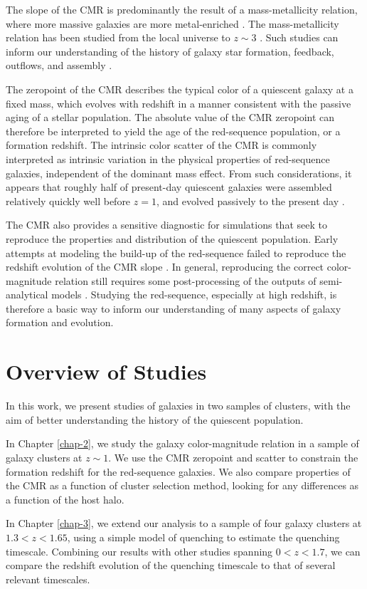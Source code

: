 The slope of the CMR is predominantly the result of a mass-metallicity relation, where more massive galaxies are more metal-enriched \citep[e.g.,][]{Bower:1992mb,Kodama:1997rr,Vazdekis:2001aa,2003AJ....125.1866B}.
The mass-metallicity relation has been studied from the local universe to $z\sim3$ \citep{Tremonti:2004aa,Kewley:2008aa,Andrews:2013aa,Erb:2006aa,Maiolino:2008aa,DeGroot:2016aa}.
Such studies can inform our understanding of the history of galaxy star formation, feedback, outflows, and assembly \citep{Finlator:2008aa,Font:2008aa,Peeples:2011aa}.

The zeropoint of the CMR describes the typical color of a quiescent galaxy at a fixed mass, which evolves with redshift in a manner consistent with the passive aging of a stellar population.
The absolute value of the CMR zeropoint can therefore be interpreted to yield the age of the red-sequence population, or a formation redshift.
The intrinsic color scatter of the CMR is commonly interpreted as intrinsic variation in the physical properties of red-sequence galaxies, independent of the dominant mass effect.
From such considerations, it appears that roughly half of present-day quiescent galaxies were assembled relatively quickly well before $z=1$, and evolved passively to the present day \citep[e.g.,][]{Bower:1998cr,Peebles:2002aa,2003ApJ...596L.143B,Mei:2009wt,Foltz:2015aa}.

The CMR also provides a sensitive diagnostic for simulations that seek to reproduce the properties and distribution of the quiescent population.
Early attempts at modeling the build-up of the red-sequence failed to reproduce the redshift evolution of the CMR slope \citep{Romeo:2008aa,Menci:2008aa}.
In general, reproducing the correct color-magnitude relation still requires some post-processing of the outputs of semi-analytical models \citep[see e.g.][]{Ascaso:2015aa}.
Studying the red-sequence, especially at high redshift, is therefore a basic way to inform our understanding of many aspects of galaxy formation and evolution.

\section{Overview of Studies}

In this work, we present studies of galaxies in two samples of clusters, with the aim of better understanding the history of the quiescent population.

In Chapter \ref{chap-2}, we study the galaxy color-magnitude relation in a sample of galaxy clusters at $z\sim1$.
We use the CMR zeropoint and scatter to constrain the formation redshift for the red-sequence galaxies.
We also compare properties of the CMR as a function of cluster selection method, looking for any differences as a function of the host halo.

In Chapter \ref{chap-3}, we extend our analysis to a sample of four galaxy clusters at $1.3 < z < 1.65$, using a simple model of quenching to estimate the quenching timescale.
Combining our results with other studies spanning $0 < z < 1.7$, we can compare the redshift evolution of the quenching timescale to that of several relevant timescales.
